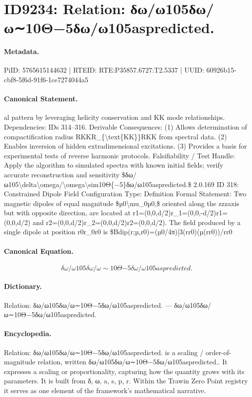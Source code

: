 \section*{ID9234: Relation: δω/ω105δω/ω∼10Θ−5δω/ω105aspredicted.}
\paragraph{Metadata.}
PiID: 5765615144632 | RTEID: RTE:P35857.6727:T2.5337 | UUID: 60926b15-cbf8-5f6d-91f6-1ce7274044a5

\paragraph{Canonical Statement.}
al pattern by leveraging helicity conservation and KK mode relationships. Dependencies: IDs 314–316. Derivable Consequences: (1) Allows determination of compactification radius RKKR\_\{\textbackslash{}text\{KK\}\}RKK from spectral data. (2) Enables inversion of hidden extradimensional excitations. (3) Provides a basis for experimental tests of reverse harmonic protocols. Falsifiability / Test Handle: Apply the algorithm to simulated spectra with known initial fields; verify accurate reconstruction and sensitivity \$δω/ω105\textbackslash{}delta\textbackslash{}omega/\textbackslash{}omega\textbackslash{}sim10Θ\{−5\}δω/ω105aspredicted.\$ 2.0.169 ID 318: Constrained Dipole Field Configuration Type: Definition Formal Statement: Two magnetic dipoles of equal magnitude \$µ0\textbackslash{}mu\_0µ0,\$ oriented along the zzzaxis but with opposite direction, are located at r1=(0,0,d/2)r\_1=(0,0,-d/2)r1=(0,0,d/2) and r2=(0,0,d/2)r\_2=(0,0,d/2)r2=(0,0,d/2). The field produced by a single dipole at position r0r\_0r0 is \$Bdip(r;µ,r0)=(µ0/4π)[3(rr0)(µ(rr0))/rr0

\paragraph{Canonical Equation.}
\[
δω/ω105\delta\omega/\omega\sim10Θ{−5}δω/ω105aspredicted.
\]

\paragraph{Dictionary.}
Relation: δω/ω105δω/ω∼10Θ−5δω/ω105aspredicted. — δω/ω105δω/ω∼10Θ−5δω/ω105aspredicted.

\paragraph{Encyclopedia.}
Relation: δω/ω105δω/ω∼10Θ−5δω/ω105aspredicted. is a scaling / order-of-magnitude relation, written δω/ω105δω/ω∼10Θ−5δω/ω105aspredicted.. It expresses a scaling or proportionality, capturing how the quantity grows with its parameters. It is built from δ, ω, a, s, p, r. Within the Trawin Zero Point registry it serves as one element of the framework's mathematical narrative.

